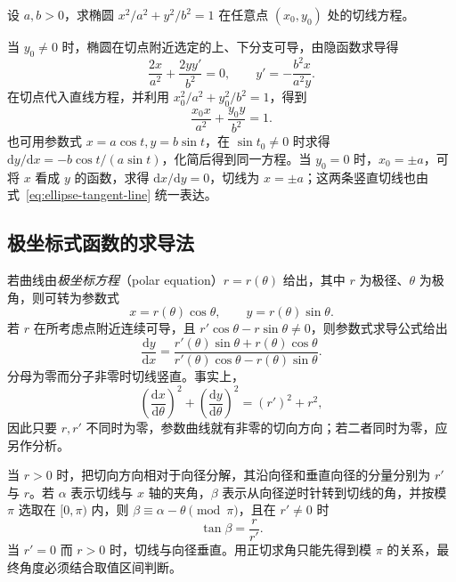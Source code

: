 \begin{example}
\label{ex:ellipse-tangent-parametric-and-implicit}
设 $a,b>0$，求椭圆 $x^2/a^2+y^2/b^2=1$ 在任意点 $(x_0,y_0)$ 处的切线方程。
\end{example}
\begin{solve}
当 $y_0\ne0$ 时，椭圆在切点附近选定的上、下分支可导，由隐函数求导得
\[
    \frac{2x}{a^2}+\frac{2yy'}{b^2}=0,
    \qquad y'=-\frac{b^2x}{a^2y}.
\]
在切点代入直线方程，并利用 $x_0^2/a^2+y_0^2/b^2=1$，得到
\begin{equation}
\label{eq:ellipse-tangent-line}
    \frac{x_0x}{a^2}+\frac{y_0y}{b^2}=1.
\end{equation}
也可用参数式 $x=a\cos t,y=b\sin t$，在 $\sin t_0\ne0$ 时求得 $\mathrm dy/\mathrm dx=-b\cos t/(a\sin t)$，化简后得到同一方程。当 $y_0=0$ 时，$x_0=\pm a$，可将 $x$ 看成 $y$ 的函数，求得 $\mathrm dx/\mathrm dy=0$，切线为 $x=\pm a$；这两条竖直切线也由式~\eqref{eq:ellipse-tangent-line} 统一表达。
\end{solve}

\subsection{极坐标式函数的求导法}
\label{subsec:polar-differentiation}

若曲线由\emph{极坐标方程}（polar equation）$r=r(\theta)$ 给出，其中 $r$ 为极径、$\theta$ 为极角，则可转为参数式
\[
    x=r(\theta)\cos\theta,\qquad y=r(\theta)\sin\theta.
\]
若 $r$ 在所考虑点附近连续可导，且 $r'\cos\theta-r\sin\theta\ne0$，则参数式求导公式给出
\begin{equation}
\label{eq:polar-curve-derivative}
    \frac{\mathrm dy}{\mathrm dx}
    =\frac{r'(\theta)\sin\theta+r(\theta)\cos\theta}
    {r'(\theta)\cos\theta-r(\theta)\sin\theta}.
\end{equation}
分母为零而分子非零时切线竖直。事实上，
\[
    \left(\frac{\mathrm dx}{\mathrm d\theta}\right)^2
    +\left(\frac{\mathrm dy}{\mathrm d\theta}\right)^2
    =(r')^2+r^2,
\]
因此只要 $r,r'$ 不同时为零，参数曲线就有非零的切向方向；若二者同时为零，应另作分析。

当 $r>0$ 时，把切向方向相对于向径分解，其沿向径和垂直向径的分量分别为 $r'$ 与 $r$。若 $\alpha$ 表示切线与 $x$ 轴的夹角，$\beta$ 表示从向径逆时针转到切线的角，并按模 $\pi$ 选取在 $[0,\pi)$ 内，则 $\beta\equiv\alpha-\theta\pmod\pi$，且在 $r'\ne0$ 时
\begin{equation}
\label{eq:polar-radius-tangent-angle}
    \tan\beta=\frac r{r'}.
\end{equation}
当 $r'=0$ 而 $r>0$ 时，切线与向径垂直。用正切求角只能先得到模 $\pi$ 的关系，最终角度必须结合取值区间判断。

